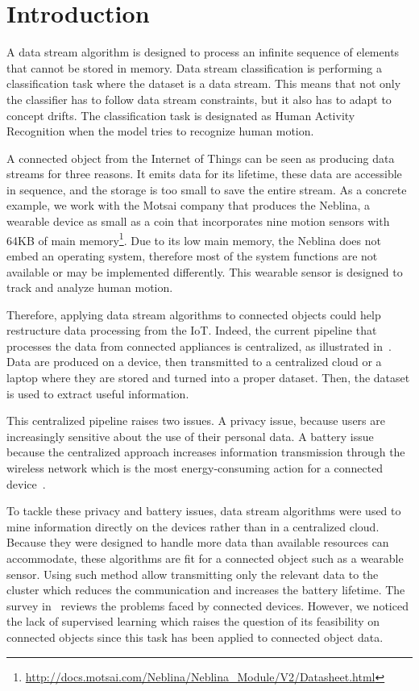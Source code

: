 \section{Introduction}
\label{sec:introduction}
A data stream algorithm is designed to process an
infinite sequence of elements that cannot be
stored in memory. Data stream classification is performing a
classification task where the dataset is a data
stream. This means that not only the classifier
has to follow data stream constraints, but it also
has to adapt to concept drifts.  The
classification task is designated as Human
Activity Recognition when the model tries to
recognize human motion.

A connected object from the Internet of Things can
be seen as producing data streams for three
reasons. It emits data for its lifetime, these
data are accessible in sequence, and the storage
is too small to save the entire stream.  As a
concrete example, we work with the Motsai company
that produces the Neblina, a wearable device as
small as a coin that incorporates nine motion
sensors with 64KB of main
memory\footnote{\url{http://docs.motsai.com/Neblina/Neblina_Module/V2/Datasheet.html}}.
Due to its low main memory, the Neblina does not
embed an operating system, therefore most of the
system functions are not available or may be
implemented differently.  This wearable sensor is
designed to track and analyze human motion.

Therefore, applying data stream algorithms to
connected objects could help restructure data
processing from the IoT.  Indeed, the current
pipeline that processes the data from connected
appliances is centralized, as illustrated
in~\cite{recofit}.  Data are produced on a device,
then transmitted to a centralized cloud or a
laptop where they are stored and turned into a
proper dataset. Then, the dataset is used to
extract useful information. 

This centralized pipeline raises two issues. A
privacy issue, because users are increasingly
sensitive about the use of their personal data.  A
battery issue because the centralized approach
increases information transmission through the
wireless network which is the most
energy-consuming action for a connected
device~\cite{sensor-network-survey,
sensor-energy-model}.

To tackle these privacy and battery issues, data stream algorithms were used to
mine information directly on the devices rather than in a centralized cloud.
Because they were designed to handle more data than available resources can
accommodate, these algorithms are fit for a connected object such as a wearable
sensor.  Using such method allow transmitting only the relevant data to the
cluster which reduces the communication and increases the battery lifetime. The
survey in~\cite{kejariwal2015} reviews the problems faced by connected devices.
However, we noticed the lack of supervised learning which raises the question
of its feasibility on connected objects since this task has been applied to
connected object data.

